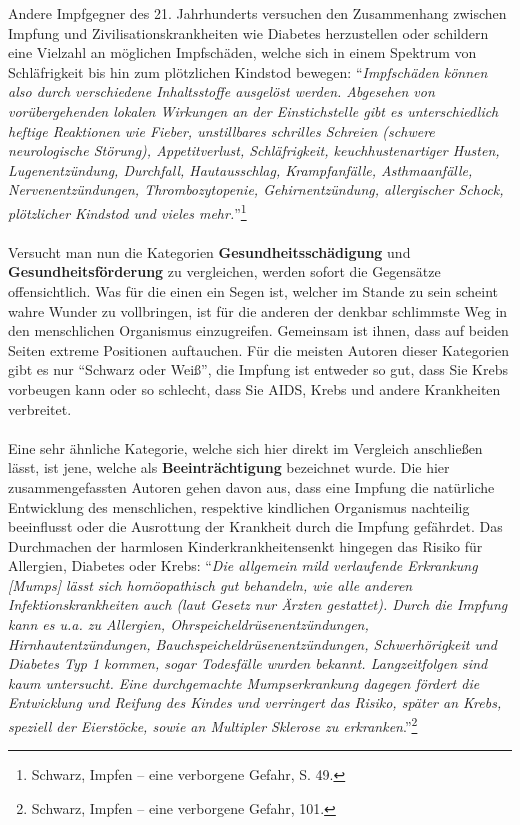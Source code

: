 \documentclass[
    a4paper,
    12pt,
    hyphens,
    chapterprefix=true,
    headheight=33pt,
    footheight=29pt,
    headings=optiontohead,
]{scrartcl}
\begin{document}
{Andere Impfgegner des 21. Jahrhunderts versuchen den Zusammenhang zwischen Impfung und Zivilisationskrankheiten wie Diabetes herzustellen oder schildern eine Vielzahl an möglichen Impfschäden, welche sich in einem Spektrum von Schläfrigkeit bis hin zum plötzlichen Kindstod bewegen: "`\textit{Impfschäden können also durch verschiedene Inhaltsstoffe ausgelöst werden. Abgesehen von vorübergehenden lokalen Wirkungen an der Einstichstelle gibt es unterschiedlich heftige Reaktionen wie Fieber, unstillbares schrilles Schreien (schwere neurologische Störung), Appetitverlust, Schläfrigkeit, keuchhustenartiger Husten, Lugenentzündung, Durchfall, Hautausschlag, Krampfanfälle, Asthmaanfälle, Nervenentzündungen, Thrombozytopenie, Gehirnentzündung, allergischer Schock, plötzlicher Kindstod und vieles mehr.}"'\footnote{Schwarz, Impfen -- eine verborgene Gefahr, S. 49.}\\
\\
Versucht man nun die Kategorien \textbf{Gesundheitsschädigung} und \textbf{Gesundheitsförderung} zu vergleichen, werden sofort die Gegensätze offensichtlich. Was für die einen ein Segen ist, welcher im Stande zu sein scheint wahre Wunder zu vollbringen, ist für die anderen der denkbar schlimmste Weg in den menschlichen Organismus einzugreifen. Gemeinsam ist ihnen, dass auf beiden Seiten extreme Positionen auftauchen. Für die meisten Autoren dieser Kategorien gibt es nur "`Schwarz oder Weiß"', die Impfung ist entweder so gut, dass Sie Krebs vorbeugen kann oder so schlecht, dass Sie AIDS, Krebs und andere Krankheiten verbreitet. \\
\\
Eine sehr ähnliche Kategorie, welche sich hier direkt im Vergleich anschließen lässt, ist jene, welche als \textbf{Beeinträchtigung} bezeichnet wurde. Die hier zusammengefassten Autoren gehen davon aus, dass eine Impfung die natürliche Entwicklung des menschlichen, respektive kindlichen Organismus nachteilig beeinflusst oder die Ausrottung der Krankheit durch die Impfung gefährdet. Das Durchmachen der \glqq harmlosen Kinderkrankheiten\grqq senkt hingegen das Risiko für Allergien, Diabetes oder Krebs: "`\textit{Die allgemein mild verlaufende Erkrankung [Mumps] lässt sich homöopathisch gut behandeln, wie alle anderen Infektionskrankheiten auch (laut Gesetz nur Ärzten gestattet). Durch die Impfung kann es u.a. zu Allergien, Ohrspeicheldrüsenentzündungen, Hirnhautentzündungen, Bauchspeicheldrüsenentzündungen, Schwerhörigkeit und Diabetes Typ 1 kommen, sogar Todesfälle wurden bekannt. Langzeitfolgen sind kaum untersucht. Eine durchgemachte Mumpserkrankung dagegen fördert die Entwicklung und Reifung des Kindes und verringert das Risiko, später an Krebs, speziell der Eierstöcke, sowie an Multipler Sklerose zu erkranken}."'\footnote{Schwarz, Impfen -- eine verborgene Gefahr, 101.}\\
}
\end{document}
